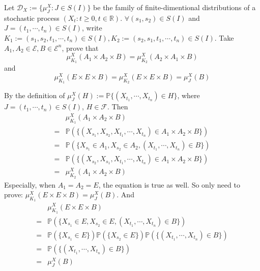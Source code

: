 \documentclass{ctexart}
\begin{document}
\begin{problem}\label{pro:3}
  Let \(\mathscr{D}_X:=\{\mu_J^X:J \in S(I)\}\) be the family of finite-dimentional distributions of a stochastic process \((X_t:t \geq 0,t \in \mathbb{R})\).
  \(\forall (s_1,s_2)\in S(I)\) and \(J=(t_1,\cdots,t_n)\in S(I)\), write \(K_1:=(s_1,s_2,t_1,\cdots,t_n) \in S(I),K_2:=(s_2,s_1,t_1,\cdots,t_n) \in S(I)\).
  Take \(A_1,A_2 \in \mathscr{E},B \in \mathscr{E}^n\), prove that
  \[
    \mu^X_{K_1}(A_1 \times A_2 \times B)=\mu^X_{K_2}(A_2 \times A_1 \times B)
  \]
  and
  \[
    \mu^X_{K_1}(E \times E \times B)=\mu^X_{K_2}(E \times E \times B)=\mu^X_{J}(B)
  \]
\end{problem}
\begin{solution}
  By the definition of \(\mu^X_{J}(H):=\mathbb{P}\{(X_{t_1},\cdots,X_{t_n}) \in H\}\),
  where \(J = (t_1,\cdots,t_n) \in S(I)\), \(H \in \mathscr{F}\).
  Then
  \begin{equation}
    \begin{aligned}
        & \mu^X_{K_1}(A_1 \times A_2 \times B)                                                 \\
      = & \mathbb{P}(\{(X_{s_1},X_{s_2},X_{t_1},\cdots,X_{t_n}) \in A_1 \times A_2 \times B\}) \\
      = & \mathbb{P}(\{X_{s_1} \in A_1, X_{s_2} \in A_2, (X_{t_1},\cdots,X_{t_n}) \in B \})    \\
      = & \mathbb{P}(\{(X_{s_2},X_{s_1},X_{t_1},\cdots,X_{t_n}) \in A_1 \times A_2 \times B\}) \\
      = & \mu^X_{K_2}(A_1 \times A_2 \times B)
    \end{aligned}
  \end{equation}
  Especially, when \(A_1=A_2=E\), the equation is true as well.
  So only need to prove: \(\mu^X_{K_1}(E \times E \times B) = \mu^X_J(B)\).
  And
  \begin{equation}
    \begin{aligned}
        & \mu^X_{K_1}(E \times E \times B)                                                                          \\
      = & \mathbb{P}(\{X_{s_1} \in E, X_{s_2} \in E, (X_{t_1},\cdots,X_{t_n}) \in B \})                             \\
      = & \mathbb{P}(\{X_{s_1} \in E\})\mathbb{P}(\{X_{s_2} \in E\})\mathbb{P}(\{(X_{t_1},\cdots,X_{t_n}) \in B \}) \\
      = & \mathbb{P}(\{(X_{t_1},\cdots,X_{t_n}) \in B\})                                                            \\
      = & \mu^X_J(B)
    \end{aligned}
  \end{equation}
\end{solution}
\end{document}
